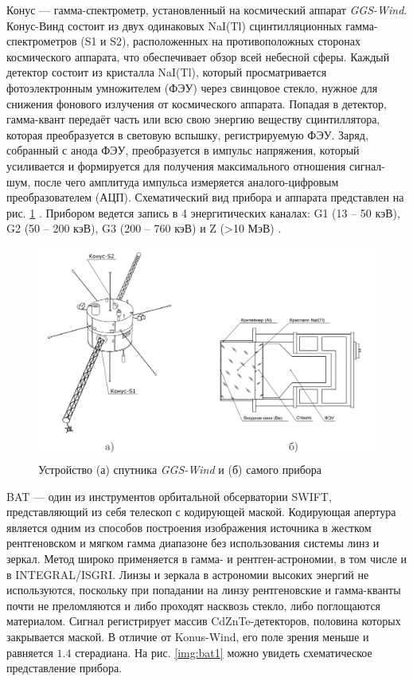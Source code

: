 	Конус --- гамма-спектрометр, установленный на космический аппарат \textit{GGS-Wind}. Конус-Винд состоит из двух одинаковых NaI(Tl) сцинтилляционных гамма-спектрометров (S1 и S2), расположенных на противоположных сторонах космического аппарата, что обеспечивает обзор всей небесной сферы. Каждый детектор состоит из кристалла NaI(Tl), который  просматривается фотоэлектронным умножителем (ФЭУ) через свинцовое стекло, нужное для снижения фонового излучения от космического аппарата. Попадая в детектор, гамма-квант передаёт часть или всю свою энергию
веществу сцинтиллятора, которая преобразуется в световую вспышку, регистрируемую ФЭУ. Заряд, собранный с анода ФЭУ, преобразуется в импульс напряжения, который усиливается и формируется для получения максимального отношения сигнал-шум, после чего амплитуда импульса измеряется аналого-цифровым преобразователем (АЦП). Схематический вид прибора и аппарата представлен на рис. \ref{img:kw1} \cite{Svinkin_thesis}. Прибором ведется запись в 4 энергитических каналах: G1 (13 -- 50 кэВ), G2 (50 -- 200 кэВ), G3 (200 -- 760 кэВ) и Z (>10 МэВ) \cite{aptekarr.l.1993}.

	\begin{figure}[h!]
		\centering
		\includegraphics[width = 0.65\linewidth]{pictures/Konus-Wind.png}
		\caption{Устройство (а) спутника \textit{GGS-Wind} и (б) самого прибора}
		\label{img:kw1}
	\end{figure}
	
	BAT --- один из инструментов орбитальной обсерватории SWIFT, представляющий из себя телескоп с кодирующей маской. Кодирующая апертура является одним из способов построения изображения источника в жестком рентгеновском и мягком гамма диапазоне без использования системы линз и зеркал. Метод широко применяется в гамма- и рентген-астрономии, в том числе и в INTEGRAL/ISGRI. Линзы и зеркала в астрономии высоких энергий не используются, поскольку при попадании на линзу рентгеновские и гамма-кванты почти не преломляются и либо проходят насквозь стекло, либо поглощаются материалом. Сигнал регистрирует массив CdZnTe-детекторов, половина которых закрывается маской. В отличие от Konus-Wind, его поле зрения меньше и равняется $1.4$ стерадиана. На рис. \ref{img:bat1} можно увидеть схематическое представление прибора.
	 
